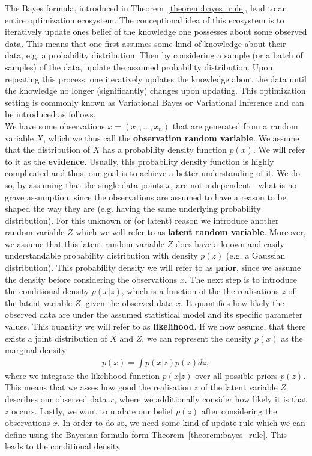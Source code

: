 The Bayes formula, introduced in Theorem~\ref{theorem:bayes_rule}, lead to an entire optimization ecosystem. The conceptional idea of this ecosystem is to iteratively update ones belief of the knowledge one possesses about some observed data. This means that one first assumes some kind of knowledge about their data, e.g. a probability distribution. Then by considering a sample (or a batch of samples) of the data, update the assumed probability distribution. Upon repeating this process, one iteratively updates the knowledge about the data until the knowledge no longer (significantly) changes upon updating. This optimization setting is commonly known as Variational Bayes or Variational Inference and can be introduced as follows.\\
We have some observations $x=(x_1,\ldots, x_n)$ that are generated from a random variable $X$, which we thus call the \textbf{observation random variable}. We assume that the distribution of $X$ has a probability density function $p(x)$. We will refer to it as the \textbf{evidence}. Usually, this probability density function is highly complicated and thus, our goal is to achieve a better understanding of it. We do so, by assuming that the single data points $x_i$ are not independent - what is no grave assumption, since the observations are assumed to have a reason to be shaped the way they are (e.g. having the same underlying probability distribution). For this unknown or (or latent) reason we introduce another random variable $Z$ which we will refer to as \textbf{latent random variable}. Moreover, we assume that this latent random variable $Z$ does have a known and \glqq easily understandable\grqq{} probability distribution with density $p(z)$ (e.g. a Gaussian distribution). This probability density we will refer to as \textbf{prior}, since we assume the density before considering the observations $x$. The next step is to introduce the conditional density $p(x|z)$, which is a function of the the realisations  $z$ of the latent variable $Z$, given the observed data $x$. It quantifies how likely the observed data are under the assumed statistical model and its specific parameter values. This quantity we will refer to as \textbf{likelihood}. If we now assume, that there exists a joint distribution of $X$ and $Z$, we can represent the density $p(x)$ as the marginal density
\begin{align}\label{eq:evidence}
p(x) = \int p(x|z) p(z) dz,
\end{align}
where we integrate the likelihood function $p(x|z)$ over all possible priors $p(z)$. This means that we asses how good the realisation $z$ of the latent variable $Z$ describes our observed data $x$, where we additionally consider how likely it is that $z$ occurs. Lastly, we want to update our belief $p(z)$ after considering the observations $x$. In order to do so, we need some kind of update rule which we can define using the Bayesian formula form Theorem~\ref{theorem:bayes_rule}. This leads to the conditional density
